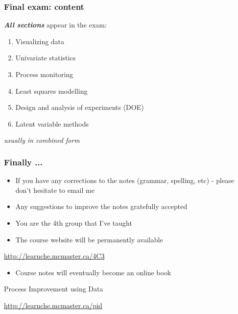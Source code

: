 \begin{frame}\frametitle{Final exam: content}
	
	\textbf{\emph{All sections}} appear in the exam:
	\begin{enumerate}
		\item	Visualizing data 
		\item	Univariate statistics 
		\item	Process monitoring 
		\item	Least squares modelling 
		\item	Design and analysis of experiments (DOE) 
		\item	Latent variable methods 
	\end{enumerate}
	\emph{usually in combined form}
\end{frame}

\begin{frame}\frametitle{Finally ...}
	\begin{itemize}
		\item	If you have any corrections to the notes (grammar, spelling, etc) - please don't hesitate to email me 
		\item	Any suggestions to improve the notes gratefully accepted 
		\item	You are the 4th group that I've taught
		\item	The course website will be permanently available 
	\end{itemize}
	\begin{block}{}
		\href{http://learnche.mcmaster.ca/4C3}{http://learnche.mcmaster.ca/4C3}
	\end{block}

	\vspace{24pt}
	\begin{itemize}
		\item	Course notes will eventually become an online book 
	\end{itemize}
	
	
	\begin{block}
		{Process Improvement using Data} 
		\begin{center}
			\href{http://learnche.mcmaster.ca/pid}{http://learnche.mcmaster.ca/pid} 
		\end{center}
	\end{block}
\end{frame}

